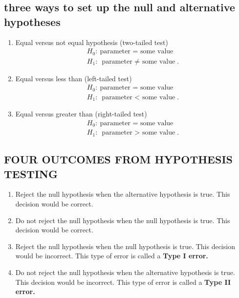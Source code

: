 \documentclass{report}
\begin{document}
    \bigbreak \noindent \bigbreak \noindent 
    \subsection*{three ways to set up the null and alternative hypotheses}
    \bigbreak \noindent 
        \begin{enumerate}
        \item Equal versus not equal hypothesis (two-tailed test)
            \begin{align*}
                H_{0}:\ \text{parameter = some value} \\
                H_{1}:\ \text{parameter $\ne$ some value}
            .\end{align*}
        \item Equal versus less than (left-tailed test)
            \begin{align*}
                H_{0}:\ \text{parameter = some value} \\
                H_{1}:\ \text{parameter $<$ some value}
            .\end{align*}
        \item Equal versus greater than (right-tailed test)
            \begin{align*}
                H_{0}:\ \text{parameter = some value} \\
                H_{1}:\ \text{parameter $>$ some value}
            .\end{align*}
    \end{enumerate}

    \bigbreak \noindent \bigbreak \noindent 
    \subsection*{FOUR OUTCOMES FROM HYPOTHESIS TESTING}
    \bigbreak \noindent 
        \begin{enumerate}
        \item Reject the null hypothesis when the alternative hypothesis is true. This decision would be correct.
        \item Do not reject the null hypothesis when the null hypothesis is true. This decision would be correct.
        \item Reject the null hypothesis when the null hypothesis is true. This decision would be incorrect. This type of error is called a \textbf{Type I error.}
        \item Do not reject the null hypothesis when the alternative hypothesis is true. This decision would be incorrect. This type of error is called a \textbf{Type II error.}
    \end{enumerate}
    \bigbreak \noindent 
\end{document}
